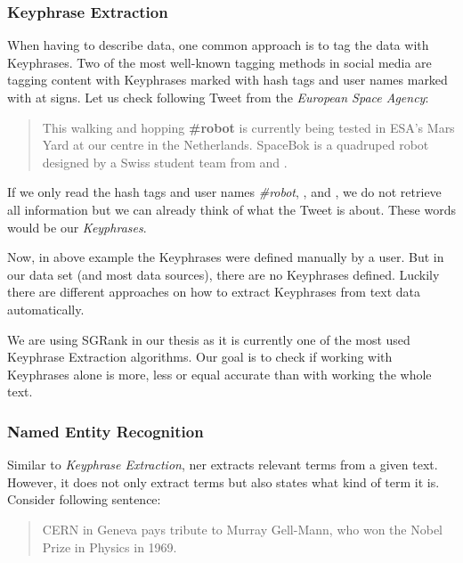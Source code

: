 \subsubsection{Keyphrase Extraction}
\label{subsubsec:3_keyphrase_extraction}

When having to describe data, one common approach is to tag the data with Keyphrases.
Two of the most well-known tagging methods in social media
are tagging content with Keyphrases marked with hash tags and user names marked with at signs.
Let us check following Tweet from the \textit{European Space Agency}\cite{ESATweet}:

\begin{quote}
    This walking and hopping \textbf{\#robot} is currently being tested in ESA’s Mars Yard
    at our \textbf{} centre in the Netherlands.
    SpaceBok is a quadruped robot designed by a Swiss student team from \textbf{}
    and \textbf{}.
\end{quote}

If we only read the hash tags and user names \textit{\#robot}, \textit{},
\textit{} and \textit{},
we do not retrieve all information but we can already think of what the Tweet is about.
These words would be our \textit{Keyphrases}.

Now, in above example the Keyphrases were defined manually by a user.
But in our data set (and most data sources), there are no Keyphrases defined.
Luckily there are different approaches on how to extract Keyphrases from text data automatically.

We are using SGRank\cite{SGRank} in our thesis as it is currently one of the most used Keyphrase Extraction algorithms.
Our goal is to check if working with Keyphrases alone is more, less or equal accurate
than with working the whole text.

\subsubsection{Named Entity Recognition}
\label{subsubsec:3_named_entity_recognition}

Similar to \textit{Keyphrase Extraction}, \Gls{ner} extracts relevant terms from a given text.
However, it does not only extract terms but also states what kind of term it is.
Consider following sentence:

\begin{quote}
    CERN in Geneva pays tribute to Murray Gell-Mann, who won the Nobel Prize in Physics in 1969.
\end{quote}

